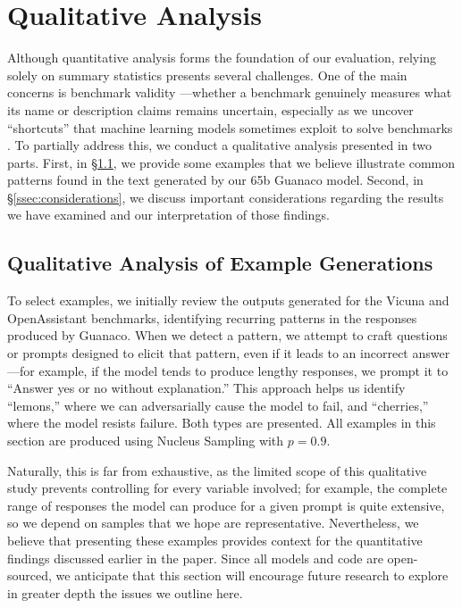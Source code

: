 \section{Qualitative Analysis}

Although quantitative analysis forms the foundation of our evaluation, relying solely on summary statistics presents several challenges. One of the main concerns is benchmark validity \citep{liao2021we}—whether a benchmark genuinely measures what its name or description claims remains uncertain, especially as we uncover “shortcuts” that machine learning models sometimes exploit to solve benchmarks \citep{gururangan2018annotation, poliak2018hypothesis}. To partially address this, we conduct a qualitative analysis presented in two parts. First, in \S\ref{ssec:examples}, we provide some examples that we believe illustrate common patterns found in the text generated by our 65b {Guanaco} model. Second, in \S\ref{ssec:considerations}, we discuss important considerations regarding the results we have examined and our interpretation of those findings.

\subsection{Qualitative Analysis of Example Generations}
\label{ssec:examples}

To select examples, we initially review the outputs generated for the Vicuna and OpenAssistant benchmarks, identifying recurring patterns in the responses produced by {Guanaco}. When we detect a pattern, we attempt to craft questions or prompts designed to elicit that pattern, even if it leads to an incorrect answer—for example, if the model tends to produce lengthy responses, we prompt it to “Answer yes or no without explanation.” This approach helps us identify “lemons,” where we can adversarially cause the model to fail, and “cherries,” where the model resists failure. Both types are presented. All examples in this section are produced using Nucleus Sampling \cite{holtzmancurious} with $p=0.9$.

Naturally, this is far from exhaustive, as the limited scope of this qualitative study prevents controlling for every variable involved; for example, the complete range of responses the model can produce for a given prompt is quite extensive, so we depend on samples that we hope are representative. Nevertheless, we believe that presenting these examples provides context for the quantitative findings discussed earlier in the paper. Since all models and code are open-sourced, we anticipate that this section will encourage future research to explore in greater depth the issues we outline here.

